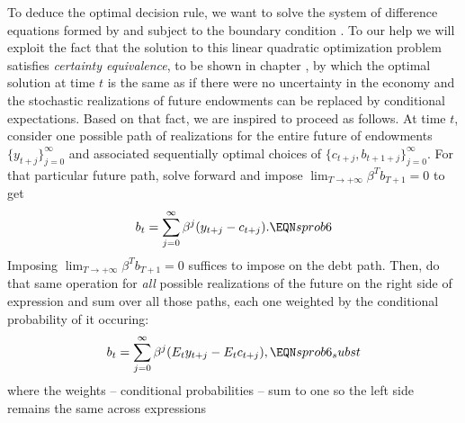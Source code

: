 


 To deduce the optimal decision rule, we want to solve the system
of difference equations formed by  and  
subject to the boundary condition . 
To our help we
will exploit the fact that the solution to this linear quadratic
optimization problem satisfies {\it certainty equivalence\/},
to be shown in chapter , by which the optimal
solution at time $t$ is the same as if there were no 
uncertainty in the economy and the stochastic realizations of
future endowments can be replaced by conditional
expectations. Based on that fact, we are
inspired to proceed as follows. At time $t$, consider one possible path 
of realizations for the entire future of endowments
$\{y_{t+j}\}_{j=0}^\infty$ and associated sequentially
optimal choices of $\{c_{t+j}, b_{t+1+j}\}_{j=0}^\infty$.
For that particular future path, 
solve  forward and impose $\lim_{T\rightarrow +\infty} \beta^T b_{T+1} =0$ to get
$$ b_t = \sum_{j=0}^\infty \beta^j (y_{t+j} - c_{t+j}) .  \EQN sprob6 $$
Imposing $\lim_{T\rightarrow +\infty} \beta^T b_{T+1} =0$ suffices to impose  on the debt path. Then, do that
same operation for {\it all\/} possible realizations of the 
future on the right side of expression  and sum 
over all those paths, each
one weighted by the conditional probability of it occuring:
$$ b_t = \sum_{j=0}^\infty \beta^j (E_t y_{t+j} - E_t c_{t+j}) ,  \EQN sprob6_subst $$
where the weights -- conditional probabilities -- sum to one
so the left side remains the same across expressions
